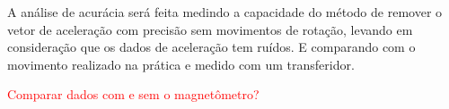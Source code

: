 A análise de acurácia será feita medindo a capacidade do método de remover o vetor de aceleração com precisão sem movimentos de rotação, levando em consideração que os dados de aceleração tem ruídos. E comparando com o movimento realizado na prática e medido com um transferidor.

\textcolor{red}{Comparar dados com e sem o magnetômetro?}

\section{}
